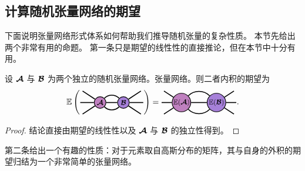 \subsection{计算随机张量网络的期望} 
下面说明张量网络形式体系如何帮助我们推导随机张量的复杂性质。 
本节先给出两个非常有用的命题。
第一条只是期望的线性性的直接推论，但在本节中十分有用。
\begin{proposition}\label{prop:inner-expectation}
    设 $\bm{\mathcal{A}}$ 与 $\bm{\mathcal{B}}$ 为两个独立的随机张量网络。张量网络。则二者内积的期望为 
$$\EE\left(\begin{tikzpicture}[baseline=\baseline]
    \tikzset{tensor/.style = {minimum size = 0.5cm,shape = circle,thick,draw=black,inner sep = 0pt}, edge/.style = {thick,line width=.4mm},every loop/.style={}}
    \def\y{0}
    \def\x{0}
    \node[tensor,fill=red!50!blue!50!white] (At) at (\x,\y){\scalebox{0.85}{$\At$}};
    \node[tensor,fill=red!30!blue!50!white] (Bt) at (\x+1,\y){\scalebox{0.85}{$\Bt$}};
    \draw[edge] (At) -- (Bt);
    \draw[edge] (At) to [out=45,in=135] (Bt);
    \draw[edge] (At) to [out=-45,in=-135] (Bt);
    \draw[edge](At)--(\x-0.85,\y);
    \draw[edge](At)--(\x-0.75,\y+0.5);    \draw[edge](At)--(\x-0.75,\y-0.5);
    \draw[edge](Bt)--(\x+1.85,\y);
    \draw[edge](Bt)--(\x+1.75,\y+0.5);    \draw[edge](Bt)--(\x+1.75,\y-0.5);
\end{tikzpicture} \right)
=
\begin{tikzpicture}[baseline=\baseline]
    \tikzset{tensor/.style = {minimum size = 0.8cm,shape = circle,thick,draw=black,inner sep = 0pt}, edge/.style = {thick,line width=.4mm},every loop/.style={}}
    \def\y{0}
    \def\x{0}
    \node[tensor,fill=red!50!blue!50!white] (At) at (\x,\y){\scalebox{0.85}{$\EE(\At)$}};
    \node[tensor,fill=red!30!blue!50!white] (Bt) at (\x+1.5,\y){\scalebox{0.85}{$\EE(\Bt)$}};
    \draw[edge] (At) -- (Bt);
    \draw[edge] (At) to [out=45,in=135] (Bt);
    \draw[edge] (At) to [out=-45,in=-135] (Bt);
    \draw[edge](At)--(\x-0.85,\y);
    \draw[edge](At)--(\x-0.75,\y+0.5);    \draw[edge](At)--(\x-0.75,\y-0.5);
    \draw[edge](Bt)--(\x+2.35,\y);
    \draw[edge](Bt)--(\x+2.25,\y+0.5);    \draw[edge](Bt)--(\x+2.25,\y-0.5);
\end{tikzpicture}.
$$
\begin{proof}
结论直接由期望的线性性以及 $\bm{\mathcal{A}}$ 与 $\bm{\mathcal{B}}$ 的独立性得到。
\end{proof}
\end{proposition}
第二条给出一个有趣的性质：对于元素取自高斯分布的矩阵，其与自身的外积的期望归结为一个非常简单的张量网络。 
